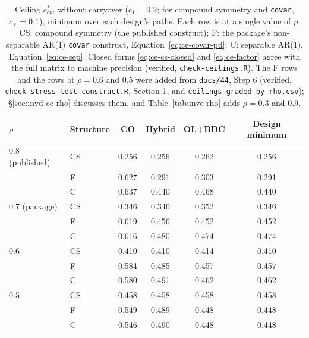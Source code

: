 \documentclass[11pt]{article}
\newcommand{\code}[1]{\texttt{#1}}
\begin{document}
\begin{table}[h]
\centering\small
\caption{Ceiling $c_{bm}^{\ast}$ without carryover ($c_1 = 0.2$; for
compound symmetry and \code{covar}, $c_\times = 0.1$), minimum over each
design's paths. Each row is at a single value of $\rho$. CS: compound
symmetry (the published construct); F: the package's non-separable
AR(1) \code{covar} construct, Equation~\eqref{eq:ce-covar-pd}; C:
separable AR(1), Equation~\eqref{eq:ce-sep}. Closed forms
\eqref{eq:ce-cs-closed} and \eqref{eq:ce-factor} agree with the full
matrix to machine precision (verified, \code{check-ceilings.R}). The F
rows and the rows at $\rho = 0.6$ and 0.5 were added from
\code{docs/44}, Step 6 (verified, \code{check-stress-test-construct.R}, Section 1, and
\code{ceilings-graded-by-rho.csv}); \S\ref{sec:invd-ce-rho} discusses
them, and Table~\ref{tab:inve-rho} adds $\rho = 0.3$ and 0.9.}
\label{tab:ce-ceilings}
\begin{tabular}{@{}llcccc@{}}
\toprule
$\rho$ & Structure & CO & Hybrid & OL+BDC & Design minimum \\
\midrule
0.8 (published) & CS & 0.256 & 0.256 & 0.262 & 0.256 \\
                & F  & 0.627 & 0.291 & 0.303 & 0.291 \\
                & C  & 0.637 & 0.440 & 0.468 & 0.440 \\
0.7 (package)   & CS & 0.346 & 0.346 & 0.352 & 0.346 \\
                & F  & 0.619 & 0.456 & 0.452 & 0.452 \\
                & C  & 0.616 & 0.480 & 0.474 & 0.474 \\
0.6             & CS & 0.410 & 0.410 & 0.414 & 0.410 \\
                & F  & 0.584 & 0.485 & 0.457 & 0.457 \\
                & C  & 0.580 & 0.491 & 0.462 & 0.462 \\
0.5             & CS & 0.458 & 0.458 & 0.458 & 0.458 \\
                & F  & 0.549 & 0.489 & 0.448 & 0.448 \\
                & C  & 0.546 & 0.490 & 0.448 & 0.448 \\
\bottomrule
\end{tabular}
\end{table}
\end{document}
